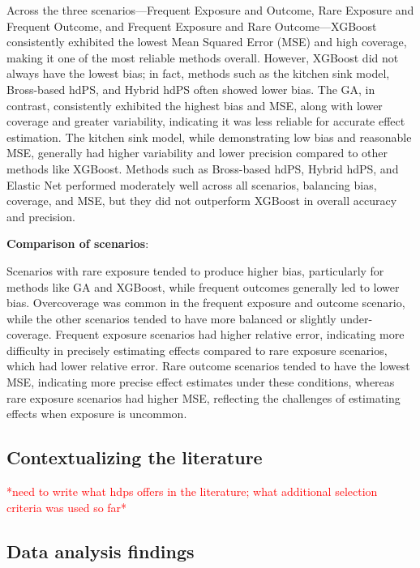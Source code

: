\documentclass[sn-vancouver,Numbered,lineno,pdflatex]{sn-jnl}
\begin{document}
Across the three scenarios---Frequent Exposure and Outcome, Rare
Exposure and Frequent Outcome, and Frequent Exposure and Rare
Outcome---XGBoost consistently exhibited the lowest Mean Squared Error
(MSE) and high coverage, making it one of the most reliable methods
overall. However, XGBoost did not always have the lowest bias; in fact,
methods such as the kitchen sink model, Bross-based hdPS, and Hybrid
hdPS often showed lower bias. The GA, in contrast, consistently
exhibited the highest bias and MSE, along with lower coverage and
greater variability, indicating it was less reliable for accurate effect
estimation. The kitchen sink model, while demonstrating low bias and
reasonable MSE, generally had higher variability and lower precision
compared to other methods like XGBoost. Methods such as Bross-based
hdPS, Hybrid hdPS, and Elastic Net performed moderately well across all
scenarios, balancing bias, coverage, and MSE, but they did not
outperform XGBoost in overall accuracy and precision.

\textbf{Comparison of scenarios}:

Scenarios with rare exposure tended to produce higher bias, particularly
for methods like GA and XGBoost, while frequent outcomes generally led
to lower bias. Overcoverage was common in the frequent exposure and
outcome scenario, while the other scenarios tended to have more balanced
or slightly under-coverage. Frequent exposure scenarios had higher
relative error, indicating more difficulty in precisely estimating
effects compared to rare exposure scenarios, which had lower relative
error. Rare outcome scenarios tended to have the lowest MSE, indicating
more precise effect estimates under these conditions, whereas rare
exposure scenarios had higher MSE, reflecting the challenges of
estimating effects when exposure is uncommon.

\subsection{Contextualizing the
literature}\label{contextualizing-the-literature}

\textcolor{red}{*need to write what hdps offers in the literature; what additional selection criteria was used so far*}

\subsection{Data analysis findings}\label{data-analysis-findings}
\end{document}
